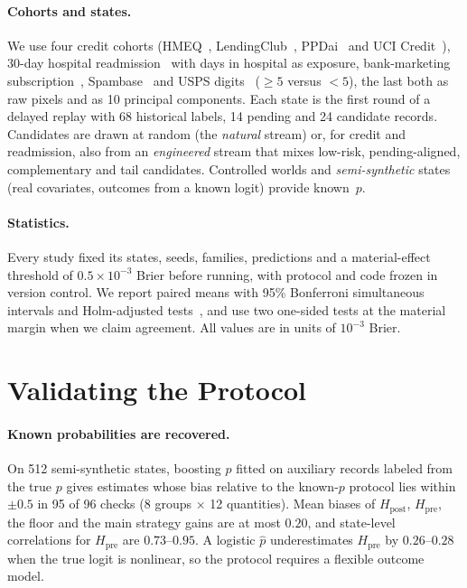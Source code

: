 \documentclass[runningheads]{llncs}
\newcommand{\Hpost}{H_{\mathrm{post}}}
\newcommand{\Hpre}{H_{\mathrm{pre}}}
\begin{document}
\paragraph{Cohorts and states.} We use four credit cohorts (HMEQ~\cite{sasHMEQ}, LendingClub~\cite{lendingclubSource}, PPDai~\cite{ppdaiSource,he2018ensemble} and UCI Credit~\cite{yeh2009comparison}), 30-day hospital readmission~\cite{strack2014impact} with days in hospital as exposure, bank-marketing subscription~\cite{moro2014bank}, Spambase~\cite{hopkins1999spambase} and USPS digits~\cite{hull1994usps} ($\ge5$ versus $<5$), the last both as raw pixels and as 10 principal components. Each state is the first round of a delayed replay with 68 historical labels, 14 pending and 24 candidate records. Candidates are drawn at random (the \emph{natural} stream) or, for credit and readmission, also from an \emph{engineered} stream that mixes low-risk, pending-aligned, complementary and tail candidates. Controlled worlds and \emph{semi-synthetic} states (real covariates, outcomes from a known logit) provide known~$p$.

\paragraph{Statistics.} Every study fixed its states, seeds, families, predictions and a material-effect threshold of $0.5\times10^{-3}$ Brier before running, with protocol and code frozen in version control. We report paired means with 95\% Bonferroni simultaneous intervals and Holm-adjusted tests~\cite{holm1979simple}, and use two one-sided tests at the material margin when we claim agreement. All values are in units of $10^{-3}$ Brier.

\section{Validating the Protocol}
\label{sec:validation}
\paragraph{Known probabilities are recovered.} On 512 semi-synthetic states, boosting $\hat p$ fitted on auxiliary records labeled from the true $p$ gives estimates whose bias relative to the known-$p$ protocol lies within $\pm0.5$ in 95 of 96 checks (8 groups $\times$ 12 quantities). Mean biases of $\Hpost$, $\Hpre$, the floor and the main strategy gains are at most $0.20$, and state-level correlations for $\Hpre$ are $0.73$--$0.95$. A logistic $\hat p$ underestimates $\Hpre$ by $0.26$--$0.28$ when the true logit is nonlinear, so the protocol requires a flexible outcome model.
\end{document}
